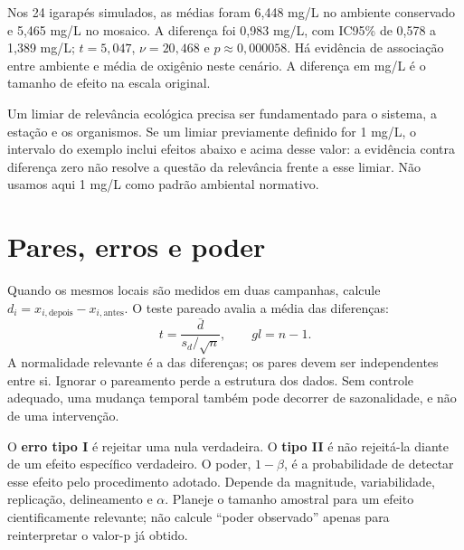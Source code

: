 \begin{exemplo}
Nos 24 igarapés simulados, as médias foram 6,448 mg/L no ambiente conservado e 5,465 mg/L no mosaico. A diferença foi 0,983 mg/L, com IC95\% de 0,578 a 1,389 mg/L; $t=5{,}047$, $\nu=20{,}468$ e $p\approx0{,}000058$. Há evidência de associação entre ambiente e média de oxigênio neste cenário. A diferença em mg/L é o tamanho de efeito na escala original.
\end{exemplo}

Um limiar de relevância ecológica precisa ser fundamentado para o sistema, a estação e os organismos. Se um limiar previamente definido for 1 mg/L, o intervalo do exemplo inclui efeitos abaixo e acima desse valor: a evidência contra diferença zero não resolve a questão da relevância frente a esse limiar. Não usamos aqui 1 mg/L como padrão ambiental normativo.

\section{Pares, erros e poder}
Quando os mesmos locais são medidos em duas campanhas, calcule $d_i=x_{i,\mathrm{depois}}-x_{i,\mathrm{antes}}$. O teste pareado avalia a média das diferenças:
\begin{equation}t=\frac{\bar d}{s_d/\sqrt n},\qquad gl=n-1.\end{equation}
A normalidade relevante é a das diferenças; os pares devem ser independentes entre si. Ignorar o pareamento perde a estrutura dos dados. Sem controle adequado, uma mudança temporal também pode decorrer de sazonalidade, e não de uma intervenção.

O \textbf{erro tipo I} é rejeitar uma nula verdadeira. O \textbf{tipo II} é não rejeitá-la diante de um efeito específico verdadeiro. O poder, $1-\beta$, é a probabilidade de detectar esse efeito pelo procedimento adotado. Depende da magnitude, variabilidade, replicação, delineamento e $\alpha$. Planeje o tamanho amostral para um efeito cientificamente relevante; não calcule ``poder observado'' apenas para reinterpretar o valor-p já obtido.


